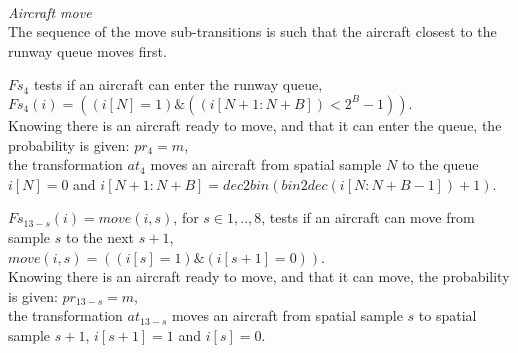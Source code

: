 \documentclass[letterpaper]{article}
\begin{document}
\emph{\\Aircraft move}\\
The sequence of the move sub-transitions is such that the aircraft closest to the runway queue moves first.

\begin{description}
\item $Fs_{4}$ tests if an aircraft can enter the runway queue,\\
$Fs_{4}(i) = ((i[N] = 1)\& ((i[N+1:N+B]) < 2^B -1)).$\\
Knowing there is an aircraft ready to move, and that it can enter the queue, the probability is given: $pr_{4} = m$,\\
the transformation $at_{4}$ moves an aircraft from spatial sample $N$ to the queue $i[N] = 0$ and $i[N+1:N+B] = dec2bin(bin2dec(i[N:N+B-1])+1)$.

\item $Fs_{13-s}(i) = move(i,s)$,  for $s \in {1,..,8}$, tests if an aircraft can move from sample $s$ to the next $s+1$,\\
$move(i,s) = ((i[s] = 1)\&(i[s+1] = 0))$.\\
Knowing there is an aircraft ready to move, and that it can move, the probability is given: $pr_{13-s} = m$,\\
the transformation $at_{13-s}$ moves an aircraft from spatial sample $s$ to spatial sample $s+1$, $i[s+1] = 1$ and $i[s] = 0$.
\end{description}

\fi
\end{document}
